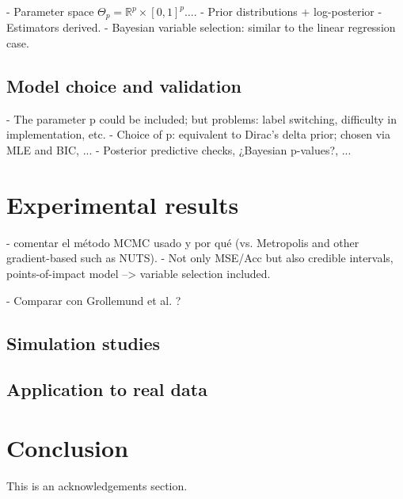 \documentclass[ba]{imsart}
\numberwithin{equation}{section}
\theoremstyle{plain}
\newcommand{\R}{\mathbb{R}}
\newenvironment{comment}
{
\noindent \em \color{red}
}
{
\color{black}
}
\begin{document}
\begin{comment}
  - Parameter space \(\Theta_p = \R^p \times [0, 1]^p\ldots\).
  - Prior distributions + log-posterior
  - Estimators derived.
  - Bayesian variable selection: similar to the linear regression case.
\end{comment}

\subsection{Model choice and validation}\label{sec:model-choice}

\begin{comment}
  - The parameter p could be included; but problems: label switching, difficulty in implementation, etc.
  - Choice of p: equivalent to Dirac's delta prior; chosen via MLE and BIC, ...
  - Posterior predictive checks, ¿Bayesian p-values?, ...
\end{comment}



\section{Experimental results}

\begin{comment}
  - comentar el método MCMC usado y por qué (vs. Metropolis and other gradient-based such as NUTS).
  - Not only MSE/Acc but also credible intervals, points-of-impact model --> variable selection included.

  - Comparar con Grollemund et al. ?
\end{comment}

\subsection{Simulation studies}

\subsection{Application to real data}

\section{Conclusion}

\begin{supplement}
\end{supplement}




\begin{acks}[Acknowledgments]
This is an acknowledgements section.
\end{acks}
\end{document}

